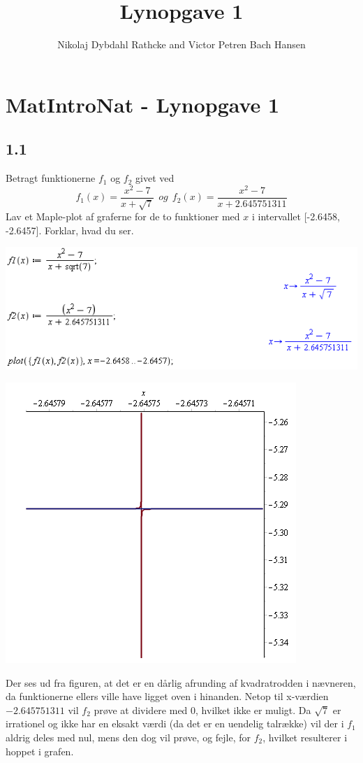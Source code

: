 \documentclass[12pt]{article}
\title{Lynopgave 1}
\author{Nikolaj Dybdahl Rathcke and Victor Petren Bach Hansen}
\begin{document}
\section*{MatIntroNat - Lynopgave 1}
\subsection*{1.1}
Betragt funktionerne $f_1$ og $f_2$ 	givet ved
$$f_1(x)=\frac{x^2-7}{x+\sqrt{7}}\:\:og\:\:f_2(x)=\frac{x^2-7}{x+2.645751311}$$
Lav et Maple-plot af graferne for de to funktioner med $x$ i intervallet [-2.6458, -2.6457]. Forklar, hvad du ser.\\
\begin{center}
\includegraphics[scale=0.6]{1.png}
\end{center}
\begin{center}
\includegraphics[scale=0.6]{2.png}
\end{center}
Der ses ud fra figuren, at det er en dårlig afrunding af kvadratrodden i nævneren, da funktionerne ellers ville have ligget oven i hinanden. Netop til x-værdien $-2.645751311$ vil $f_2$ prøve at dividere med 0, hvilket ikke er muligt. Da $\sqrt{7}$ er irrationel og ikke har en eksakt værdi (da det er en uendelig talrække) vil der i $f_1$ aldrig deles med nul, mens den dog vil prøve, og fejle, for $f_2$, hvilket resulterer i hoppet i grafen.
\end{document}
